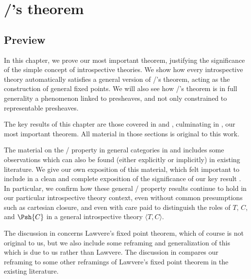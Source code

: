 \filestart

\section{\Loeb/'s theorem}
\subsection{Preview}
In this chapter, we prove our most important theorem, justifying the significance of the simple concept of introspective theories. We show how every introspective theory automatically satisfies a general version of \Loeb/'s theorem, acting as the construction of general fixed points. We will also see how \Loeb/'s theorem is in full generality a phenomenon linked to presheaves, and not only constrained to representable presheaves.

The key results of this chapter are those covered in  and , culminating in , our most important theorem. All material in those sections is original to this work.

The material on the \Loeb/ property in general categories in  and  includes some observations which can also be found (either explicitly or implicitly) in existing literature. We give our own exposition of this material, which felt important to include in a clean and complete exposition of the significance of our key result . In particular, we confirm how these general \Loeb/ property results continue to hold in our particular introspective theory context, even without common presumptions such as cartesian closure, and even with care paid to distinguish the roles of $T$, $C$, and $\Psh{C}$ in a general introspective theory $\langle T, C \rangle$.

The discussion in  concerns Lawvere's fixed point theorem, which of course is not original to us, but we also include some reframing and generalization of this which is due to us rather than Lawvere. The discussion in  compares our reframing to some other reframings of Lawvere's fixed point theorem in the existing literature.

